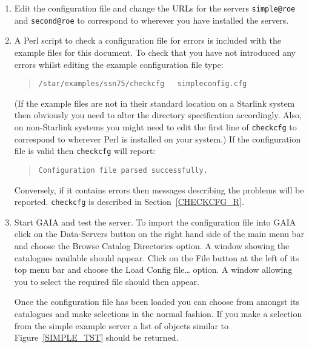 \documentclass[twoside,11pt]{article}
\renewcommand{\_}{\texttt{\symbol{95}}}
\begin{document}
\begin{enumerate}

  \item Edit the configuration file and change the URLs for the servers
   {\tt simple@roe} and {\tt second@roe} to correspond to wherever
   you have installed the servers.

  \item A Perl script to check a configuration file for errors is
   included with the example files for this document.  To check that
   you have not introduced any errors whilst editing the example
   configuration file type:

  \begin{quote}
   {\tt /star/examples/ssn75/checkcfg ~ simpleconfig.cfg}
  \end{quote}

   (If the example files are not in their standard location on a Starlink
   system then obviously you need to alter the directory specification
   accordingly.  Also, on non-Starlink systems you might need to edit the
   first line of {\tt checkcfg} to correspond to wherever Perl is installed
   on your system.)  If the configuration file is valid then {\tt checkcfg}
   will report:

  \begin{quote}
   {\tt Configuration file parsed successfully.}
  \end{quote}

   Conversely, if it contains errors then messages describing the problems
   will be reported.  {\tt checkcfg} is described in
   Section~\ref{CHECKCFG_R}.

  \item Start GAIA and test the server.  To import the configuration
   file into GAIA click on the {\sf Data-Servers} button on the right
   hand side of the main menu bar and choose the {\sf Browse Catalog
   Directories} option.  A window showing the catalogues available should
   appear.  Click on the {\sf File} button at the left of its top menu
   bar and choose the {\sf Load Config file\ldots} option.  A window
   allowing you to select the required file should then appear.

   Once the configuration file has been loaded you can choose from
   amongst its catalogues and make selections in the normal fashion.
   If you make a selection from the simple example server a list of
   objects similar to Figure~\ref{SIMPLE_TST} should be returned.

\end{enumerate}
\end{document}
